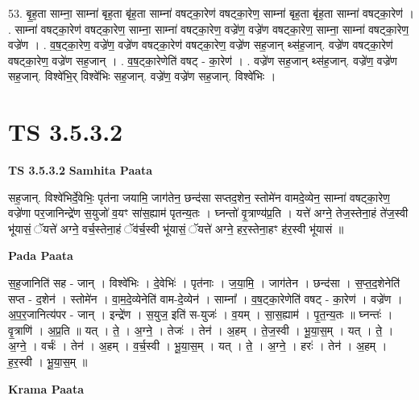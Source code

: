 \documentclass[17pt]{extarticle}
\begin{document}
53. बृ॒ह॒ता साम्ना॒ साम्ना॑ बृह॒ता बृ॑ह॒ता साम्ना॑ वषट्का॒रेण॑ वषट्का॒रेण॒ साम्ना॑ बृह॒ता बृ॑ह॒ता साम्ना॑ वषट्का॒रेण॑ । . साम्ना॑ वषट्का॒रेण॑ वषट्का॒रेण॒ साम्ना॒ साम्ना॑ वषट्का॒रेण॒ वज्रे॑ण॒ वज्रे॑ण वषट्का॒रेण॒ साम्ना॒ साम्ना॑ वषट्का॒रेण॒ वज्रे॑ण । . व॒ष॒ट्का॒रेण॒ वज्रे॑ण॒ वज्रे॑ण वषट्का॒रेण॑ वषट्का॒रेण॒ वज्रे॑ण सह॒जान् थ्स॑ह॒जान्. वज्रे॑ण वषट्का॒रेण॑ वषट्का॒रेण॒ वज्रे॑ण सह॒जान् । . व॒ष॒ट्का॒रेणेति॑ वषट् - का॒रेण॑ । . वज्रे॑ण सह॒जान् थ्स॑ह॒जान्. वज्रे॑ण॒ वज्रे॑ण सह॒जान्. विश्वे॑भि॒र् विश्वे॑भिः सह॒जान्. वज्रे॑ण॒ वज्रे॑ण सह॒जान्. विश्वे॑भिः । \newline
\pagebreak
{}

\section{ TS 3.5.3.2 }

\textbf{TS 3.5.3.2 } \newline
\textbf{Samhita Paata} \newline

सह॒जान्. विश्वे॑भिर्दे॒वेभिः॒ पृत॑ना जयामि॒ जाग॑तेन॒ छन्द॑सा सप्तद॒शेन॒ स्तोमे॑न वामदे॒व्येन॒ साम्ना॑ वषट्का॒रेण॒ वज्रे॑णा पर॒जानिन्द्रे॑ण स॒युजो॑ व॒यꣳ सा॑स॒ह्याम॑ पृतन्य॒तः । घ्नन्तो॑ वृ॒त्राण्य॑प्र॒ति । यत्ते॑ अग्ने॒ तेज॒स्तेना॒हं ते॑ज॒स्वी भू॑यासं॒ ॅयत्ते॑ अग्ने॒ वर्च॒स्तेना॒हं ॅव॑र्च॒स्वी भू॑यासं॒ ॅयत्ते॑ अग्ने॒ हर॒स्तेना॒हꣳ ह॑र॒स्वी भू॑यासं ॥ \newline

\textbf{Pada Paata} \newline

स॒ह॒जानिति॑ सह - जान् । विश्वे॑भिः । दे॒वेभिः॑ । पृत॑नाः । ज॒या॒मि॒ । जाग॑तेन । छन्द॑सा । स॒प्त॒द॒शेनेति॑ सप्त - द॒शेन॑ । स्तोमे॑न । वा॒म॒दे॒व्येनेति॑ वाम-दे॒व्येन॑ । साम्ना᳚ । व॒ष॒ट्का॒रेणेति॑ वषट् - का॒रेण॑ । वज्रे॑ण । अ॒प॒र॒जानित्य॑पर - जान् । इन्द्रे॑ण । स॒युज॒ इति॑ स-युजः॑ । व॒यम् । सा॒स॒ह्याम॑ । पृ॒त॒न्य॒तः ॥ घ्नन्तः॑ । वृ॒त्राणि॑ । अ॒प्र॒ति ॥ यत् । ते॒ । अ॒ग्ने॒ । तेजः॑ । तेन॑ । अ॒हम् । ते॒ज॒स्वी । भू॒या॒स॒म् । यत् । ते॒ । अ॒ग्ने॒ । वर्चः॑ । तेन॑ । अ॒हम् । व॒र्च॒स्वी । भू॒या॒स॒म् । यत् । ते॒ । अ॒ग्ने॒ । हरः॑ । तेन॑ । अ॒हम् । ह॒र॒स्वी । भू॒या॒स॒म् ॥  \newline


\textbf{Krama Paata} \newline
\end{document}
